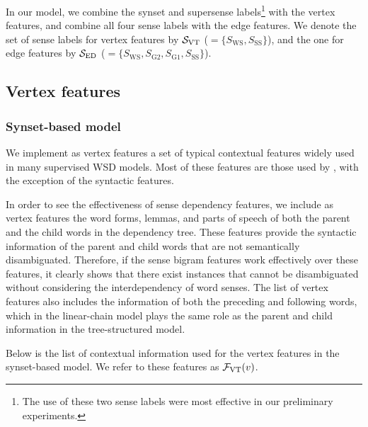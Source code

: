\documentclass[english]{jnlp_1.4}
\begin{document}
In our model, we combine the synset and supersense labels\footnote{The use of these two sense labels were most effective in our preliminary experiments.} with the vertex features, and combine all four sense labels with the edge features.
We denote the set of sense labels for vertex features by ${\cal S}_{\mathrm{VT}}$ ($= \{ S_{\mathrm{WS}}, S_{\mathrm{SS}} \}$), and the one for edge features by ${\cal S}_{\mathrm{ED}}$ ($= \{ S_{\mathrm{WS}}, S_{\mathrm{G2}}, S_{\mathrm{G1}}, S_{\mathrm{SS}} \}$).


\begin{table}[t]
\caption{An example of sense labels for \textit{bank(n)\#1}}
\label{table:sense-label}

\vspace{1\baselineskip}
\end{table}

\subsection{Vertex features}
\label{section:vertex-features}

\subsubsection{Synset-based model}

We implement as vertex features a set of typical contextual features widely used in many supervised WSD models. 
Most of these features are those used by \cite{lee:2002}, with the exception of the syntactic features.

In order to see the effectiveness of sense dependency features, we include as vertex features the word forms, lemmas, and parts of speech of both the parent and the child words in the dependency tree.
These features provide the syntactic information of the parent and child words that are not semantically disambiguated.
Therefore, if the sense bigram features work effectively over these features, it clearly shows that there exist instances that cannot be disambiguated without considering the interdependency of word senses.
The list of vertex features also includes the information of both the preceding and following words, which in the linear-chain model plays the same role as the parent and child information in the tree-structured model.

Below is the list of contextual information used for the vertex features in the synset-based model.
We refer to these features as ${\cal F}_{\mathrm{VT}}(v)$.
\end{document}

